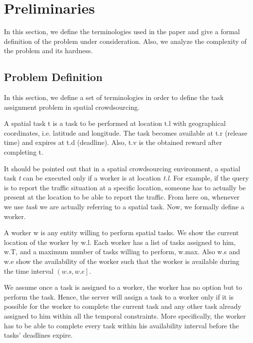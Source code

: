 \section{Preliminaries}

In this section, we define the terminologies used in the paper and give a formal definition of the problem under consideration. Also, we analyze the complexity of the problem and its hardness.

\subsection{Problem Definition}

In this section, we define a set of terminologies in order to define the task assignment problem in spatial crowdsourcing.

\begin{definition} 
A spatial task t is a task to be performed at location t.l with geographical coordinates, i.e. latitude and longitude. The task becomes available at t.r (release time) and expires at t.d (deadline). Also, t.v is the obtained reward after completing t.
\end{definition}

It should be pointed out that in a spatial crowdsourcing environment, a spatial task \emph{t} can be executed only if a worker is at location \emph{t.l}. For example, if the query is to report the traffic situation at a specific location, someone has to actually be present at the location to be able to report the traffic. From here on, whenever we use \emph{task} we are actually referring to a spatial task. Now, we formally define a worker.

\begin{definition} [Worker]
A worker w is any entity willing to perform spatial tasks. We show the current location of the worker by w.l. Each worker has a list of tasks assigned to him, w.T, and a maximum number of tasks willing to perform, w.max. Also w.s and w.e show the availability of the worker such that the worker is available during the time interval $\left( w.s, w.e \right]$.
\end{definition}

We assume once a task is assigned to a worker, the worker has no option but to perform the task. Hence, the server will assign a task to a worker only if it is possible for the worker to complete the current task and any other task already assigned to him within all the temporal constraints. More specifically, the worker has to be able to complete every task within his availability interval before the tasks' deadlines expire.

